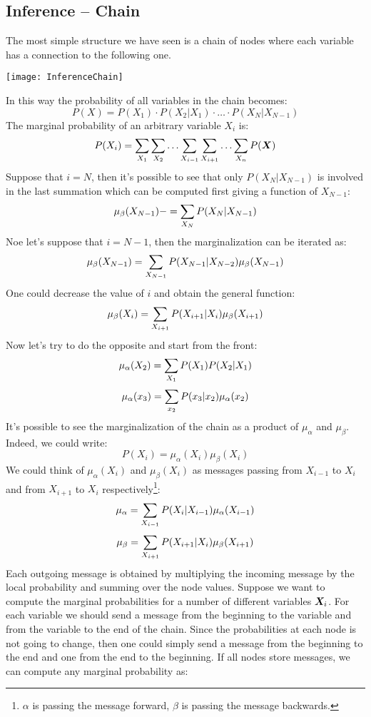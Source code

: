 \subsection{Inference -- Chain}
The most simple structure we have seen is a chain of nodes where each variable has a connection to the following one. 
\begin{center}
  \texttt{[image: InferenceChain]}
\end{center}
In this way the probability of all variables in the chain becomes:
\[P(X)=P(X_1)\cdot P(X_2\vert X_1)\cdot \hdots \cdot P(X_{N}\vert X_{N-1})\]
The marginal probability of an arbitrary variable $X_i$ is:
\[P(X_i)=\displaystyle\sum_{X_1}\displaystyle\sum_{X_2}\hdots \displaystyle\sum_{X_{i-1}}\displaystyle\sum_{X_{i+1}}\hdots\displaystyle\sum_{X_n}P(\bm{X})\]
Suppose that $i=N$, then it's possible to see that only $P(X_N\vert X_{N-1})$ is involved in the last summation which can be computed first giving a function of $X_{N-1}$:
\[\mu_\beta(X_{N-1})-=\displaystyle\sum_{X_N}P(X_N\vert X_{N-1})\]
Noe let's suppose that $i=N-1$, then the marginalization can be iterated as:
\[\mu_\beta(X_{N-1})=\displaystyle\sum_{X_{N-1}}P(X_{N-1}\vert X_{N-2})\mu_\beta(X_{N-1})\]
One could decrease the value of $i$ and obtain the general function:
\[\mu_\beta(X_i)=\displaystyle\sum_{X_{i+1}}P(X_{i+1}\vert X_{i})\mu_\beta(X_{i+1})\]
Now let's try to do the opposite and start from the front: 
\[\mu_\alpha(X_2)=\displaystyle\sum_{X_1}P(X_1)P(X_2\vert X_1)\]
\[\mu_\alpha(x_3)=\displaystyle\sum_{x_2}P(x_3\vert x_2)\mu_\alpha(x_2)\]
It's possible to see the marginalization of the chain as a product of $\mu_\alpha$ and $\mu_\beta$. Indeed, we could write:
\[P(X_i)=\mu_\alpha(X_i)\mu_\beta(X_i)\]
We could think of $\mu_\alpha(X_i)$ and $\mu_\beta(X_i)$ as messages passing from $X_{i-1}$ to $X_{i}$ and from $X_{i+1}$ to $X_i$ respectively\footnote{$\alpha$ is passing the message forward, $\beta$ is passing the message backwards.}:
\[\mu_\alpha=\displaystyle\sum_{X_{i-1}}P(X_i\vert X_{i-1})\mu_\alpha(X_{i-1})\]
\[\mu_\beta=\displaystyle\sum_{X_{i+1}}P(X_{i+1}\vert X_{i})\mu_\beta(X_{i+1})\]
Each outgoing message is obtained by multiplying the incoming message by the local probability and summing over the node values. 
Suppose we want to compute the marginal probabilities for a number of different variables $\bm{X}_i$. For each variable we should send a message from the beginning to the variable and from the variable to the end of the chain. Since the probabilities at each node is not going to change, then one could simply send a message from the beginning to the end and one from the end to the beginning. If all nodes store messages, we can compute any marginal probability as:
